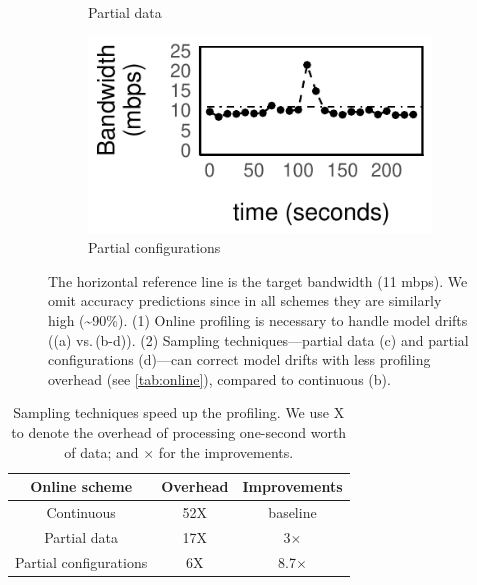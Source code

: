 \begin{figure}
\begin{subfigure}[t]{0.49\columnwidth}
    \caption{Partial data}
    \label{fig:online-partial}
  \end{subfigure}
  \hfill
  \begin{subfigure}[t]{0.49\columnwidth}
    \includegraphics[width=\textwidth]{figures/online4.pdf}
    \caption{Partial configurations}
    \label{fig:online-trigger}
  \end{subfigure}
  \caption{The horizontal reference line is the target bandwidth (11 mbps). We omit accuracy predictions  since in all schemes they are similarly high (\textasciitilde 90\%). (1) Online profiling is necessary to handle model drifts ((a) vs.\,(b-d)). (2) Sampling techniques---partial data (c) and partial configurations (d)---can correct model drifts with less profiling overhead (see \autoref{tab:online}), compared to continuous (b).}
  \label{fig:online-tricks}
\end{figure}


\begin{table}[t]
  \centering
  \begin{tabular}{c c c}
    \toprule
    Online scheme & Overhead & Improvements \\
    \midrule
    Continuous & 52X & baseline \\
    Partial data & 17X & 3$\times$\\
    Partial configurations & 6X & 8.7$\times$ \\
    \bottomrule
  \end{tabular}
  \caption{Sampling techniques speed up the profiling. We use X to denote the
    overhead of processing one-second worth of data; and $\times$ for the
    improvements.}
  \label{tab:online}
\end{table}

